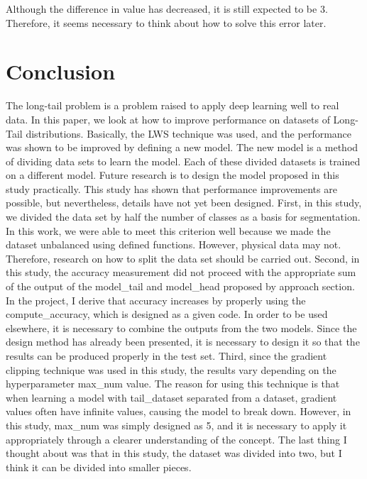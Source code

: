 \documentclass[extendedabs]{bmvc2k}
\begin{document}
  Although the difference in value has decreased, it is still expected to be 3. Therefore, it seems necessary to think about how to solve this error later.





\section{Conclusion}
  \quad The long-tail problem is a problem raised to apply deep learning well to real data. In this paper, we look at how to improve performance on datasets of Long-Tail distributions. 
  Basically, the LWS technique was used, and the performance was shown to be improved by defining a new model. The new model is a method of dividing data sets to learn the model. 
  Each of these divided datasets is trained on a different model.
  \newline 
  \newline Future research is to design the model proposed in this study practically. This study has shown that performance improvements are possible, but nevertheless, 
  details have not yet been designed. 
  \newline
  \newline First, in this study, we divided the data set by half the number of classes as a basis for segmentation. 
  In this work, we were able to meet this criterion well because we made the dataset unbalanced using defined functions. However, physical data may not. 
  Therefore, research on how to split the data set should be carried out.
  \newline
  \newline Second, in this study, the accuracy measurement did not proceed with the appropriate sum of the output of the model\_tail and model\_head proposed by approach section. 
  In the project, I derive that accuracy increases by properly using the compute\_accuracy, which is designed as a given code. In order to be used elsewhere, 
  it is necessary to combine the outputs from the two models. Since the design method has already been presented, 
  it is necessary to design it so that the results can be produced properly in the test set.
  \newline
  \newline Third, since the gradient clipping technique was used in this study, the results vary depending on the hyperparameter max\_num value. 
  The reason for using this technique is that when learning a model with tail\_dataset separated from a dataset, gradient values often have infinite values, 
  causing the model to break down. However, in this study, max\_num was simply designed as 5, and it is necessary to apply it appropriately through a clearer 
  understanding of the concept.
  \newline
  \newline The last thing I thought about was that in this study, the dataset was divided into two, but I think it can be divided into smaller pieces.
\end{document}
